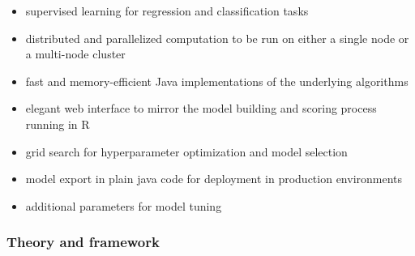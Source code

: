 \documentclass[11pt]{article}
\begin{document}
\begin{itemize}

\item supervised learning for regression and classification tasks

\item distributed and parallelized computation to be run on either a single node or a multi-node cluster

\item fast and memory-efficient Java implementations of the underlying algorithms

\item elegant web interface to mirror the model building and scoring process running in R

\item grid search for hyperparameter optimization and model selection

\item model export in plain java code for deployment in production environments

\item additional parameters for model tuning

\end{itemize}

\subsubsection{Theory and framework} 
\end{document}

